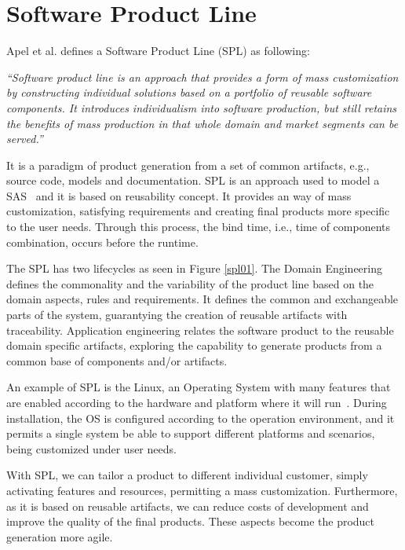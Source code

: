 
\section {Software Product Line}

Apel et al. \cite{SPL10} defines a Software Product Line (SPL) as following:

\textit{``Software product line is an approach that provides a form of mass customization by constructing individual solutions based on a portfolio of reusable software components. It introduces individualism into software production, but still retains the benefits of mass production in that whole domain and market segments can be served.''}

It is a paradigm of product generation from a set of common artifacts, e.g., source code, models and documentation. SPL is an approach used to model a SAS~\cite{SPL10} and  it is based on reusability concept. It provides an way of mass customization, satisfying requirements and creating final products more specific to the user needs. Through this process, the bind time, i.e., time of components combination, occurs before the runtime.

The SPL has two lifecycles as seen in Figure \ref{spl01}. The Domain Engineering defines the commonality and the variability of the product line based on the domain aspects, rules and requirements. It defines the common and exchangeable parts of the system, guarantying the creation of reusable artifacts with traceability. Application engineering relates the software product to the reusable domain specific artifacts, exploring the capability to generate products from a common base of components and/or artifacts.

%

An example of SPL is the Linux, an Operating System with many features that are enabled according to the hardware and platform where it will run~\cite{Apel2013}. During installation, the OS is configured according to the operation environment, and it permits a single system be able to support different platforms and scenarios, being customized under user needs.


With SPL, we can tailor a product to different individual customer, simply activating features and resources, permitting a mass customization. Furthermore, as it is based on reusable artifacts, we can reduce costs of development and improve the quality of the final products. These aspects become the product generation more agile.

